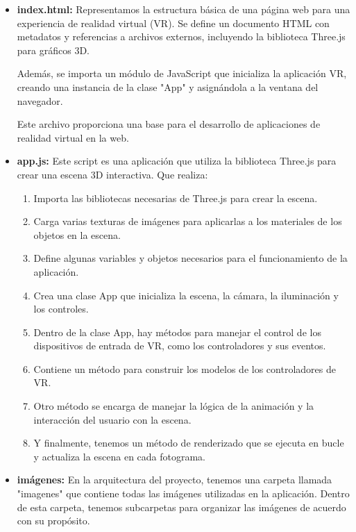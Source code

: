 \documentclass[a4paper, 12pt]{book}
\begin{document}
\begin{itemize}
  \item \textbf{index.html:} Representamos la estructura básica de una página web para una experiencia de realidad virtual (VR). 
  Se define un documento HTML con metadatos y referencias a archivos externos, incluyendo la biblioteca Three.js para gráficos 3D. 
  
  Además, se importa un módulo de JavaScript que inicializa la aplicación VR, creando una instancia de la clase "App" y asignándola a la ventana del navegador. 
  
  Este archivo proporciona una base para el desarrollo de aplicaciones de realidad virtual en la web.
  
  \item \textbf{app.js:} Este script es una aplicación que utiliza la biblioteca Three.js para crear una escena 3D interactiva. Que realiza:
    
    \begin{enumerate}
      \item Importa las bibliotecas necesarias de Three.js para crear la escena.
      \item Carga varias texturas de imágenes para aplicarlas a los materiales de los objetos en la escena.
      \item Define algunas variables y objetos necesarios para el funcionamiento de la aplicación.
      \item Crea una clase App que inicializa la escena, la cámara, la iluminación y los controles.
      \item Dentro de la clase App, hay métodos para manejar el control de los dispositivos de entrada de VR, como los controladores y sus eventos.
      \item Contiene un método para construir los modelos de los controladores de VR.
      \item Otro método se encarga de manejar la lógica de la animación y la interacción del usuario con la escena.
      \item Y finalmente, tenemos un método de renderizado que se ejecuta en bucle y actualiza la escena en cada fotograma.
    \end{enumerate}

  \item \textbf{imágenes:} En la arquitectura del proyecto, tenemos una carpeta llamada "imagenes" que contiene todas las imágenes utilizadas en la aplicación. 
  Dentro de esta carpeta, tenemos subcarpetas para organizar las imágenes de acuerdo con su propósito.


\end{itemize}
\end{document}
